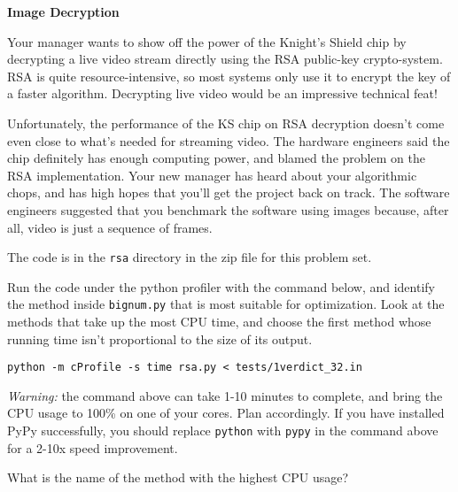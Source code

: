 \documentclass[12pt,twoside]{article}
\begin{document}
\begin{problems}
\problem {} \textbf{Image Decryption}

Your manager wants to show off the power of the Knight's Shield chip by
decrypting a live video stream directly using the RSA public-key crypto-system.
RSA is quite resource-intensive, so most systems only use it to encrypt the key
of a faster algorithm. Decrypting live video would be an impressive technical
feat!

Unfortunately, the performance of the KS chip on RSA decryption doesn't come
even close to what's needed for streaming video. The hardware engineers said the
chip definitely has enough computing power, and blamed the problem on the
RSA implementation. Your new manager has heard about your algorithmic chops, and
has high hopes that you'll get the project back on track. The software engineers
suggested that you benchmark the software using images because, after all, video
is just a sequence of frames.

The code is in the \texttt{rsa} directory in the zip file for this problem set.

\begin{problemparts}
\problempart {} Run the code under the python profiler with the command
below, and identify the method inside \texttt{bignum.py} that is most suitable
for optimization. Look at the methods that take up the most CPU time, and
choose the first method whose running time isn't proportional to the size of its
output.

\texttt{python -m cProfile -s time rsa.py < tests/1verdict\_32.in}

\textit{Warning:} the command above can take 1-10 minutes to complete, and
bring the CPU usage to 100\% on one of your cores. Plan accordingly. If
you have installed PyPy successfully, you should replace \texttt{python} with
\texttt{pypy} in the command above for a 2-10x speed improvement. 

What is the name of the method with the highest CPU usage?


\end{problemparts}
\end{problems}
\end{document}
